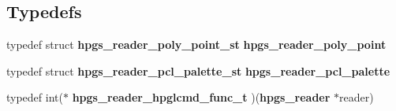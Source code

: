 \subsection*{Typedefs}
\begin{DoxyCompactItemize}
\item 
typedef struct {\bf hpgs\_\-reader\_\-poly\_\-point\_\-st} {\bfseries hpgs\_\-reader\_\-poly\_\-point}\label{group__reader_ga4233c42f8f157dfd34fbf704a9eefd11}

\item 
typedef struct {\bf hpgs\_\-reader\_\-pcl\_\-palette\_\-st} {\bfseries hpgs\_\-reader\_\-pcl\_\-palette}\label{group__reader_ga23384ae34cc53b73e033a90721614351}

\item 
typedef int($\ast$ {\bfseries hpgs\_\-reader\_\-hpglcmd\_\-func\_\-t} )({\bf hpgs\_\-reader} $\ast$reader)\label{group__reader_ga40224d7369a3a297ff59fc5d3fb81f1c}

\end{DoxyCompactItemize}
